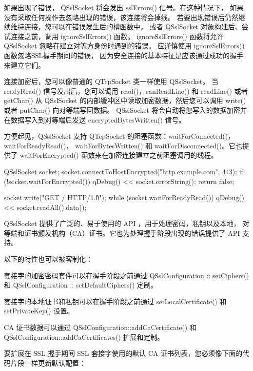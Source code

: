 如果出现了错误， QSslSocket 将会发出 sslErrors() 信号。在这种情况下，
如果没有采取任何操作去忽略出现的错误，该连接将会掉线。
若要出现错误后仍然继续维持连接，您可以在错误发生后的槽函数中，
或者 QSslSocket 对象构建后、尝试连接之前，调用 ignoreSslErrors() 函数。
ignoreSslErrors() 函数将允许 QSslSocket 忽略在建立对等方身份时遇到的错误。
 应谨慎使用 ignoreSslErrors() 函数忽略SSL握手期间的错误，
 因为安全连接的基本特征是应该通过成功的握手来建立它们。

连接加密后，您可以像普通的 QTcpSocket 类一样使用 QSslSocket。
当 readyRead() 信号发出后，您可以调用 read()，canReadLine() 和 readLine() 或者 
getChar() 从 QSslSocket 的内部缓冲区中读取加密数据，然后您可以调用 write() 或者 putChar() 向对等端写回数据。
 QSslSocket 将会自动将您写入的数据加密并在数据写入到对等端后发送 encryptedBytesWritten() 信号。

方便起见，QSslSocket 支持 QTcpSocket 的阻塞函数：waitForConnected()，waitForReadyRead()，
waitForBytesWritten() 和 waitForDisconnected()。它也提供了 waitForEncrypted()
 函数来在加密连接建立之前阻塞调用的线程。


\begin{cppcode}
 QSslSocket socket;
 socket.connectToHostEncrypted("http.example.com", 443);
 if (!socket.waitForEncrypted()) {
     qDebug() << socket.errorString();
     return false;
 }

 socket.write("GET / HTTP/1.0\r\n\r\n");
 while (socket.waitForReadyRead())
     qDebug() << socket.readAll().data();
\end{cppcode}

QSslSocket 提供了广泛的、易于使用的 API ，用于处理密码，私钥以及本地，
对等端和证书颁发机构（CA）证书。它也为处理握手阶段出现的错误提供了 API 支持。

以下的特性也可以被客制化：

\begin{compactitem}
\item 套接字的加密密码套件可以在握手阶段之前通过 QSslConfiguration :: setCiphers() 和 QSslConfiguration :: setDefaultCiphers() 定制。
\item 套接字的本地证书和私钥可以在握手阶段之前通过 setLocalCertificate() 和 setPrivateKey() 设置。
\item CA 证书数据可以通过 QSslConfiguration::addCaCertificate() 和 QSslConfiguration::addCaCertificates() 扩展和定制。
\end{compactitem}

要扩展在 SSL 握手期间 SSL 套接字使用的默认 CA 证书列表，您必须像下面的代码片段一样更新默认配置：

